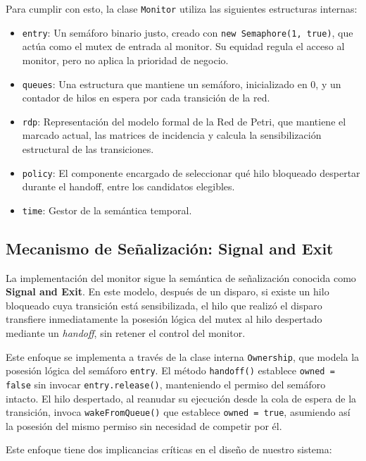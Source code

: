 \documentclass[11pt,a4paper]{article}
\begin{document}
Para cumplir con esto, la clase \texttt{Monitor} utiliza las siguientes estructuras internas:
\begin{itemize}
    \item \texttt{entry}: Un semáforo binario justo, creado con \texttt{new Semaphore(1, true)}, que actúa como el mutex de entrada al monitor. Su equidad regula el acceso al monitor, pero no aplica la prioridad de negocio.
    \item \texttt{queues}: Una estructura que mantiene un semáforo, inicializado en 0, y un contador de hilos en espera por cada transición de la red.
    \item \texttt{rdp}: Representación del modelo formal de la Red de Petri, que mantiene el marcado actual, las matrices de incidencia y calcula la sensibilización estructural de las transiciones.
    \item \texttt{policy}: El componente encargado de seleccionar qué hilo bloqueado despertar durante el handoff, entre los candidatos elegibles.
    \item \texttt{time}: Gestor de la semántica temporal.
\end{itemize}

\subsection{Mecanismo de Señalización: Signal and Exit}

La implementación del monitor sigue la semántica de señalización conocida como \textbf{Signal and Exit}. En este modelo, después de un disparo, si existe un hilo bloqueado cuya transición está sensibilizada, el hilo que realizó el disparo transfiere inmediatamente la posesión lógica del mutex al hilo despertado mediante un \textit{handoff}, sin retener el control del monitor.

Este enfoque se implementa a través de la clase interna \texttt{Ownership}, que modela la posesión lógica del semáforo \texttt{entry}. El método \texttt{handoff()} establece \texttt{owned = false} sin invocar \texttt{entry.release()}, manteniendo el permiso del semáforo intacto. El hilo despertado, al reanudar su ejecución desde la cola de espera de la transición, invoca \texttt{wakeFromQueue()} que establece \texttt{owned = true}, asumiendo así la posesión del mismo permiso sin necesidad de competir por él.

Este enfoque tiene dos implicancias críticas en el diseño de nuestro sistema:
\end{document}
